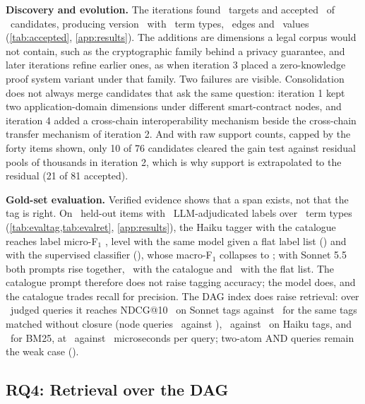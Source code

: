 \textbf{Discovery and evolution.} The iterations found \TargetsSeq\ targets
and accepted \AcceptedSeq\ of \CandidatesSeq\ candidates, producing version
\VLastNum\ with \VLastNodes\ term types, \VLastEdges\ edges and \VLastValues\
values (\cref{tab:accepted}, \cref{app:results}). The additions are
dimensions a legal corpus would not contain, such as the cryptographic family
behind a privacy guarantee, and later iterations refine earlier ones, as when
iteration 3 placed a zero-knowledge proof system variant under that family. Two failures are visible. Consolidation does
not always merge candidates that ask the same question: iteration 1 kept two
application-domain dimensions under different smart-contract nodes, and
iteration 4 added a cross-chain interoperability mechanism beside the
cross-chain transfer mechanism of iteration 2. And with raw support counts, capped by the forty items shown, only
10 of 76 candidates cleared the gain test against residual pools of thousands
in iteration 2, which is why support is extrapolated to the residual (21 of
81 accepted).

\textbf{Gold-set evaluation.} Verified evidence shows that a span exists,
not that the tag is right. On \GItems\ held-out items with \GLabels\
LLM-adjudicated labels over \GTypes\ term types (\cref{tab:evaltag,tab:evalret},
\cref{app:results}), the Haiku tagger with the catalogue reaches label
micro-F$_1$ \DagMicro, level with the same model given a flat label list
(\FlatMicro) and with the supervised classifier (\SupMicro), whose macro-F$_1$
collapses to \SupMacro; with Sonnet 5.5 both prompts rise together, \SonMicro\
with the catalogue and \SonFlatMicro\ with the flat list. The catalogue
prompt therefore does not raise tagging accuracy; the model does, and the
catalogue trades recall for precision. The DAG index does raise retrieval:
over \NQueries\ judged queries it reaches NDCG@10 \RetSonNDCG\ on Sonnet tags
against \RetSonFlatNDCG\ for the same tags matched without closure (node
queries \RetSonNode\ against \RetSonFlatNode), \RetDagNDCG\ against
\RetFlatNDCG\ on Haiku tags, and \RetBMNDCG\ for BM25, at \RetDagLat\ against
\RetBMLat\ microseconds per query; two-atom AND queries remain the weak case
(\RetSonAnd).

\subsection{RQ4: Retrieval over the DAG}
\label{sec:exp:rq4}

